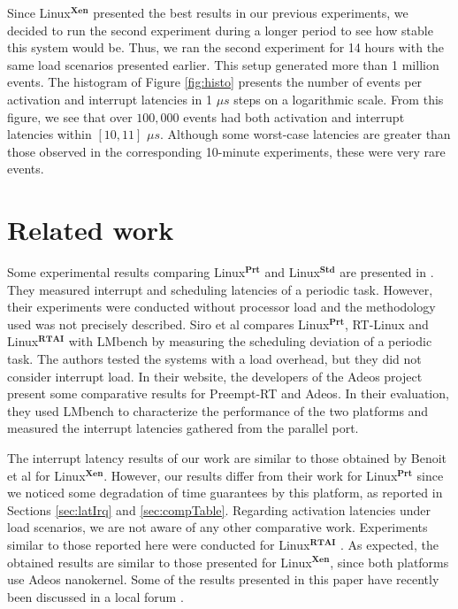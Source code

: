 \documentclass{acm_proc_article-sp}
\newcommand{\preemptt}{{Preempt-RT }}
\begin{document}
Since Linux$^\mathbf{Xen}$ presented the best results in our previous experiments,
we decided to run the second experiment during a longer period to see how stable
this system would be. Thus, we ran the second experiment for 14 hours with the same
load scenarios presented earlier. This setup generated more than 1 million events.
The histogram of Figure \ref{fig:histo} presents the number of events per activation
and interrupt latencies in 1 $\mu s$ steps on a logarithmic scale. From this figure,
we see that over $100,000$ events had both activation and interrupt latencies within
$[10, 11]$ $\mu s$. Although some worst-case latencies are greater than those
observed in the corresponding 10-minute experiments, these were very rare events.

\section{Related work}
\label{sec:trabRel}

Some experimental results comparing Linux$^{\mathbf{Prt}}$ and
Linux$^{\mathbf{Std}}$ are presented in \cite{Rostedt07}. They measured interrupt
and scheduling latencies of a periodic task. However, their experiments were
conducted without processor load and the methodology used was not precisely
described. Siro et al \cite{Siro07} compares Linux$^{\mathbf{Prt}}$, RT-Linux
\cite{rtLinux} and Linux$^{\mathbf{RTAI}}$ \cite{RTAI} with LMbench \cite{McVoy96}
by measuring the scheduling deviation of a periodic task. The authors tested the
systems with a load overhead, but they did not consider interrupt load. In their
website, the developers of the Adeos project \cite{Benoit05} present some
comparative results for \preemptt and Adeos. In their evaluation, they used LMbench
\cite{McVoy96} to characterize the performance of the two platforms and measured the
interrupt latencies gathered from the parallel port.

The interrupt latency results of our work are similar to those obtained by Benoit et
al \cite{Benoit05} for Linux$^{\mathbf{Xen}}$. However, our results differ from
their work for Linux$^{\mathbf{Prt}}$ since we noticed some degradation of time
guarantees by this platform, as reported in Sections \ref{sec:latIrq} and
\ref{sec:compTable}.  Regarding activation latencies under load scenarios, we are
not aware of any other comparative work. Experiments similar to those reported here
were conducted for Linux$^{\mathbf{RTAI}}$ \cite{Regnier08b}. As expected, the
obtained results are similar to those presented for Linux$^{\mathbf{Xen}}$, since
both platforms use Adeos nanokernel. Some of the results presented in this paper
have recently been discussed in a local forum \cite{Regnier08-wso}.
\end{document}
